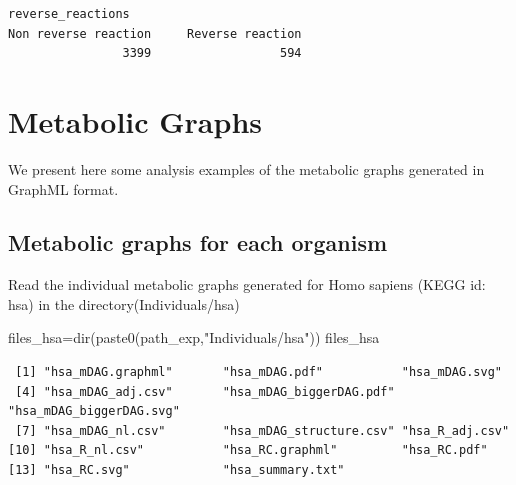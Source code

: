\documentclass[
  letterpaper,
  DIV=11,
  numbers=noendperiod]{scrreprt}
\newenvironment{Shaded}{}{}
\newcommand{\FunctionTok}[1]{\textcolor[rgb]{0.38,0.69,0.94}{#1}}
\newcommand{\NormalTok}[1]{\textcolor[rgb]{0.67,0.70,0.75}{#1}}
\newcommand{\OtherTok}[1]{\textcolor[rgb]{0.15,0.68,0.38}{#1}}
\newcommand{\StringTok}[1]{\textcolor[rgb]{0.60,0.76,0.47}{#1}}
\begin{document}
\begin{verbatim}
reverse_reactions
Non reverse reaction     Reverse reaction 
                3399                  594 
\end{verbatim}


\hypertarget{metabolic-graphs}{%
\chapter{Metabolic Graphs}\label{metabolic-graphs}}

We present here some analysis examples of the metabolic graphs generated
in GraphML format.

\hypertarget{metabolic-graphs-for-each-organism}{%
\section{Metabolic graphs for each
organism}\label{metabolic-graphs-for-each-organism}}

Read the individual metabolic graphs generated for Homo sapiens (KEGG
id: hsa) in the directory(Individuals/hsa)

\begin{Shaded}
\begin{Highlighting}[]
\NormalTok{files\_hsa}\OtherTok{=}\FunctionTok{dir}\NormalTok{(}\FunctionTok{paste0}\NormalTok{(path\_exp,}\StringTok{"Individuals/hsa"}\NormalTok{))}
\NormalTok{files\_hsa}
\end{Highlighting}
\end{Shaded}

\begin{verbatim}
 [1] "hsa_mDAG.graphml"       "hsa_mDAG.pdf"           "hsa_mDAG.svg"          
 [4] "hsa_mDAG_adj.csv"       "hsa_mDAG_biggerDAG.pdf" "hsa_mDAG_biggerDAG.svg"
 [7] "hsa_mDAG_nl.csv"        "hsa_mDAG_structure.csv" "hsa_R_adj.csv"         
[10] "hsa_R_nl.csv"           "hsa_RC.graphml"         "hsa_RC.pdf"            
[13] "hsa_RC.svg"             "hsa_summary.txt"       
\end{verbatim}
\end{document}
